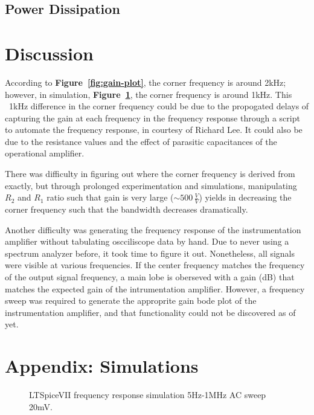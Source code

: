 \documentclass{article}
\begin{document}
\subsection{Power Dissipation}


\section{Discussion}
According to \textbf{Figure~\ref{fig:gain-plot}}, the corner frequency is around 2kHz; however, in simulation, \textbf{Figure~\ref{fig:sim-gain-plot}}, the corner frequency is around 1kHz. This ~1kHz difference in the corner frequency could be due to the propogated delays of capturing the gain at each frequency in the frequency response through a script to automate the frequency response, in courtesy of Richard Lee. It could also be due to the resistance values and the effect of parasitic capacitances of the operational amplifier. 

There was difficulty in figuring out where the corner frequency is derived from exactly, but through prolonged experimentation and simulations, manipulating $R_2$ and $R_1$ ratio such that gain is very large ($\sim500\,\frac{V}{V}$) yields in decreasing the corner frequency such that the bandwidth decreases dramatically. 

Another difficulty was generating the frequency response of the instrumentation amplifier without tabulating oscciliscope data by hand.  Due to never using a spectrum analyzer before, it took time to figure it out. Nonetheless, all signals were visible at various frequencies. If the center frequency matches the frequency of the output signal frequency, a main lobe is oberseved with a gain (dB) that matches the expected gain of the intrumentation amplifier. However, a frequency sweep was required to generate the approprite gain bode plot of the instrumentation amplifier, and that functionality could not be discovered as of yet.
\section{Appendix: Simulations}
\begin{figure}[h!]
    \begin{center}
    \end{center}
    \caption{LTSpiceVII frequency response simulation 5Hz-1MHz AC sweep 20mV.}
    \label{fig:sim-gain-plot}
\end{figure}
\end{document}
